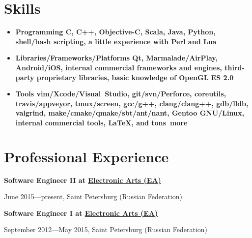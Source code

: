 \section*{Skills}

\begin{itemize}[rightmargin=\dimexpr\linewidth-17cm-\leftmargin\relax]
    \item \bfseries Programming\mdseries
        \subitem
        C,
        \bfseries C++\mdseries,
        Objective-C,
        \bfseries Scala\mdseries,
        Java,
        \bfseries Python\mdseries,
        \bfseries shell/bash \mdseries scripting,
        a little experience with Perl and Lua

    \vspace{5pt}
    \item \bfseries Libraries/Frameworks/Platforms\mdseries
        \subitem
        \bfseries Qt\mdseries,
        Marmalade/AirPlay,
        Android/iOS,
        internal commercial frameworks and engines,
        third-party proprietary libraries,
        basic knowledge of OpenGL ES 2.0

    \vspace{5pt}
    \item \bfseries Tools\mdseries
        \subitem
        \bfseries vim\mdseries/Xcode/Visual~Studio,
        \bfseries git\mdseries/svn/Perforce,
        coreutils,
        travis/appveyor,
        tmux/screen,
        gcc/g++,
        clang/clang++,
        \bfseries gdb\mdseries/lldb,
        valgrind,
        make/cmake/qmake/sbt/ant/nant,
        \bfseries Gentoo \mdseries GNU/Linux,
        internal commercial tools,
        \LaTeX,
        and \bfseries tons~\mdseries more
\end{itemize}

\section*{Professional Experience}
{
\fontsize{12pt}{12pt}\selectfont
\bfseries Software Engineer II at
\href{http://www.ea.com}{Electronic Arts (EA)}
\mdseries
}

{
\fontsize{9pt}{8pt}\selectfont
June 2015---present, Saint Petersburg (Russian Federation)
}
\vspace{5pt}

{
\fontsize{12pt}{12pt}\selectfont
\bfseries Software Engineer I at
\href{http://www.ea.com}{Electronic Arts (EA)}
\mdseries
}

{
\fontsize{9pt}{8pt}\selectfont
September 2012---May 2015, Saint Petersburg (Russian Federation)
}

